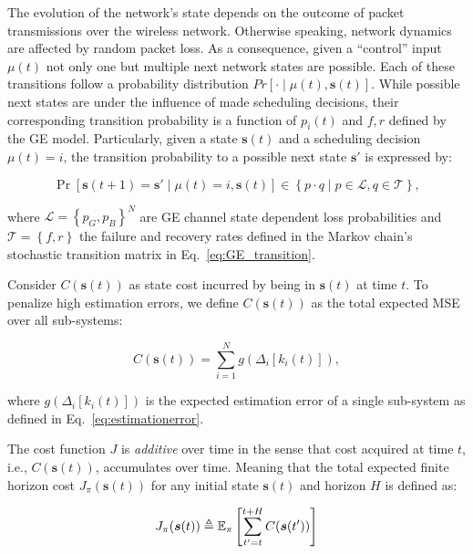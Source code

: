 The evolution of the network's state depends on the outcome of packet
transmissions over the wireless network. Otherwise speaking, network dynamics
are affected by random packet loss. As a consequence, given a ``control'' input
$\mu(t)$ not only one but multiple next network states are possible. Each of
these transitions follow a probability distribution $Pr\left[\cdot\mid\mu(t),
\boldsymbol{s}(t) \right]$. While possible next states are under the influence
of made scheduling decisions, their corresponding transition probability is a
function of $p_i(t)$ and $f,r$ defined by the GE model. Particularly, given a
state $\boldsymbol{s}(t)$ and a scheduling decision $\mu(t)=i$, the transition
probability to a possible next state $\boldsymbol{s'}$ is expressed by:

\begin{equation}
  \label{eq:transition}
  \Pr \left[ \boldsymbol{s}(t+1)=\boldsymbol{s}' \mid \mu(t)=i,\boldsymbol{s}(t)
  \right] \in \left\{ p \cdot q \mid p\in\mathcal{L},q\in\mathcal{T} \right\},
\end{equation}

where $\mathcal{L}=\left\{p_G,p_B\right\}^N$ are GE channel state dependent loss
probabilities and $\mathcal{T}=\left\{f,r\right\}$ the failure and recovery
rates defined in the Markov chain's stochastic transition matrix in
Eq.~\eqref{eq:GE_transition}.

Consider $C(\boldsymbol{s}(t))$ as state cost incurred by being in
$\boldsymbol{s}(t)$ at time $t$. To penalize high estimation errors, we define
$C(\boldsymbol{s}(t))$ as the total expected MSE over all sub-systems:

\begin{equation}
  \label{eq:gfunction}
  C(\boldsymbol{s}(t)) =  \sum_{i=1}^{N}  g(\Delta_i[k_i(t)]),
\end{equation}

where $g(\Delta_i[k_i(t)])$ is the expected estimation error of a single
sub-system as defined in Eq.~\eqref{eq:estimationerror}. 

The cost function $J$ is \textit{additive} over time in the sense that cost
acquired at time $t$, i.e., $C(\boldsymbol{s}(t))$, accumulates over time.
Meaning that the total expected finite horizon cost $J_{\pi}(\boldsymbol{s}(t))$
for any initial state $\boldsymbol{s}(t)$ and horizon $H$ is defined as:

\begin{equation}
  \label{eq:horizoncost}	
  J_\pi(\boldsymbol{s}(t)) \triangleq \mathbb{E}_\pi \left[ \sum_{t' = t }^{t + H} C(\boldsymbol{s}(t')) \right] 
\end{equation}

